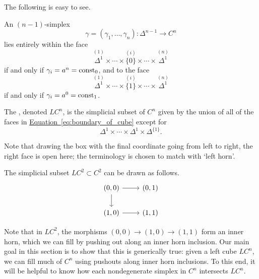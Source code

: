 \documentclass[main.tex]{subfiles}
\begin{document}
The following is easy to see.
\begin{proposition}
  \label{prop:simplex_intersect_faces}
  An $(n-1)$-simplex
  \begin{equation*}
    \gamma = (\gamma_{1}, \ldots, \gamma_{n})\colon \Delta^{n-1} \to C^{n}
  \end{equation*}
  lies entirely within the face
  \begin{equation*}
    \overset{(1)}{\Delta^{1}} \times \cdots \times \overset{(i)}{\{0\}} \times \cdots \times \overset{(n)}{\Delta^{1}}
  \end{equation*}
  if and only if $\gamma_{i} = a^{n} = \mathrm{const}_{0}$, and to the face
  \begin{equation*}
    \overset{(1)}{\Delta^{1}} \times \cdots \times \overset{(i)}{\{1\}} \times \cdots \times \overset{(n)}{\Delta^{1}}
  \end{equation*}
  if and only if $\gamma_{i} = a^0 = \mathrm{const}_{1}$.
\end{proposition}

\begin{definition}
  \label{def:left_box}
  The , denoted $LC^{n}$, is the simplicial subset of $C^{n}$ given by the union of all of the faces in \hyperref[eq:boundary_of_cube]{Equation~\ref*{eq:boundary_of_cube}} except for
  \begin{equation*}
    \Delta^{1} \times \cdots \times \Delta^{1} \times \Delta^{\{1\}}.
  \end{equation*}

  Note that drawing the box with the final coordinate going from left to right, the right face is open here; the terminology is chosen to match with `left horn'.
\end{definition}

\begin{example}
  The simplicial subset $LC^{2} \subset C^{2}$ can be drawn as follows.
  \begin{equation*}
    \begin{tikzcd}
      {(0, 0)}
      \arrow[r]
      \arrow[d]
      & {(0, 1)}
      \\
      {(1, 0)}
      \arrow[r]
      & {(1, 1)}
    \end{tikzcd}
  \end{equation*}
\end{example}

Note that in $LC^{2}$, the morphisms $(0,0) \to (1, 0) \to (1, 1)$ form an inner horn, which we can fill by pushing out along an inner horn inclusion. Our main goal in this section is to show that this is generically true: given a left cube $LC^{n}$, we can fill much of $C^{n}$ using pushouts along inner horn inclusions. To this end, it will be helpful to know how each nondegenerate simplex in $C^{n}$ intersects $LC^{n}$.
\end{document}
